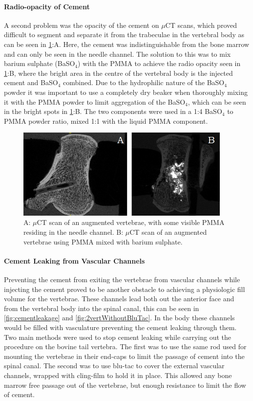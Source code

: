 \paragraph{Radio-opacity of Cement}
A second problem was the opacity of the cement on $\mu$CT scans, which proved difficult to segment and separate it from the trabeculae in the vertebral body as can be seen in \cref{fig:withWithoutBaSO4}:A. Here, the cement was indistinguishable from the bone marrow and can only be seen in the needle channel. The solution to this was to mix barium sulphate (BaSO$_4$) with the PMMA to achieve the radio opacity seen in \cref{fig:withWithoutBaSO4}:B, where the bright area in the centre of the vertebral body is the injected cement and BaSO$_4$ combined. Due to the hydrophilic nature of the BaSO$_4$ powder it was important to use a completely dry beaker when thoroughly mixing it with the PMMA powder to limit aggregation of the BaSO$_4$, which can be seen in the bright spots in \cref{fig:withWithoutBaSO4}:B. The two components were used in a 1:4 BaSO$_4$ to PMMA powder ratio, mixed 1:1 with the liquid PMMA component.

\begin{figure}[ht!]
\centering
\includegraphics[width=4.18472in]{images/withWithoutBaSo4.png}
\caption{A: $\mu$CT scan of an augmented vertebrae, with some visible PMMA residing in the needle channel. B: $\mu$CT scan of an augmented vertebrae using PMMA mixed with barium sulphate.}
\label{fig:withWithoutBaSO4}
\end{figure}
\paragraph{Cement Leaking from Vascular Channels}
Preventing the cement from exiting the vertebrae from vascular channels while injecting the cement proved to be another obstacle to achieving a physiologic fill volume for the vertebrae. These channels lead both out the anterior face and from the vertebral body into the spinal canal, this can be seen in \cref{fig:cementleakage} and \ref{fig:2vertWithoutBluTac}. In the body these channels would be filled with vasculature preventing the cement leaking through them. Two main methods were used to stop cement leaking while carrying out the procedure on the bovine tail vertebra. The first was to use the same rod used for mounting the vertebrae in their end-caps to limit the passage of cement into the spinal canal. The second was to use blu-tac to cover the external vascular channels, wrapped with cling-film to hold it in place. This allowed any bone marrow free passage out of the vertebrae, but enough resistance to limit the flow of cement.

